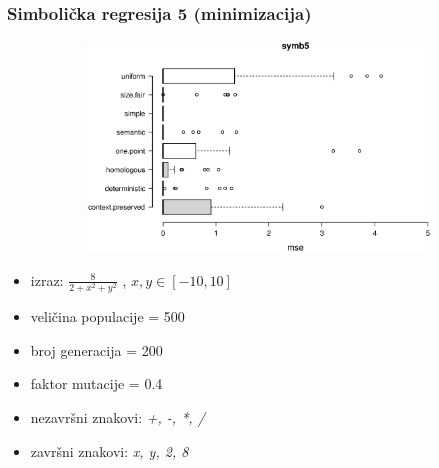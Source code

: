\documentclass{beamer}
\begin{document}
\begin{frame}
\frametitle{Simbolička regresija 5 (minimizacija)}


\begin{figure}[!htb]
\begin{figure}[H]
	\centering
	\includegraphics[trim=4cm 5.5cm 0cm 3.5cm, scale=0.3]{./boxPlots/symb5.eps}
\end{figure}

\endminipage
{}
\endminipage
\end{figure}

\begin{itemize}
\item{izraz: $\frac{8}{2 + x^2 + y^2}$ , $x, y \in [-10, 10]$}
\item{veličina populacije = 500}
\item{broj generacija = 200}
\item{faktor mutacije = 0.4}
\item{nezavršni znakovi: \textit{+, -, *, /}}
\item{završni znakovi: \textit{x, y, 2, 8}}
\end{itemize}
\end{frame}
\end{document}

